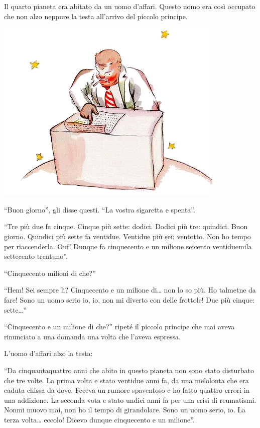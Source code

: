 \documentclass[11pt]{scrbook}
\begin{document}
Il quarto pianeta era abitato da un uomo d'affari. Questo uomo era così
occupato che non alzo neppure la testa all'arrivo del piccolo principe.

\begin{center}
\includegraphics{./img/13a.png}
\end{center}

``Buon giorno'', gli disse questi. ``La vostra sigaretta e spenta''.

``Tre più due fa cinque. Cinque più sette: dodici. Dodici più tre:
quindici. Buon giorno. Quindici più sette fa ventidue. Ventidue più sei:
ventotto. Non ho tempo per riaccenderla. Ouf! Dunque fa cinquecento e un
milione seicento ventiduemila settecento trentuno''.

``Cinquecento milioni di che?''

``Hem! Sei sempre li? Cinquecento e un milione di\ldots{} non lo so più.
Ho talmetne da fare! Sono un uomo serio io, io, non mi diverto con delle
frottole! Due più cinque: sette\ldots{}''

``Cinquecento e un milione di che?'' ripeté il piccolo principe che mai
aveva rinunciato a una domanda una volta che l'aveva espressa.

L'uomo d'affari alzo la testa:

``Da cinquantaquattro anni che abito in questo pianeta non sono stato
disturbato che tre volte. La prima volta e stato ventidue anni fa, da
una melolonta che era caduta chissa da dove. Feceva un rumore spaventoso
e ho fatto quattro errori in una addizione. La seconda vota e stato
undici anni fa per una crisi di reumatismi. Nonmi muovo mai, non ho il
tempo di girandolare. Sono un uomo serio, io. La terza volta\ldots{}
eccolo! Dicevo dunque cinquecento e un milione''.
\end{document}
